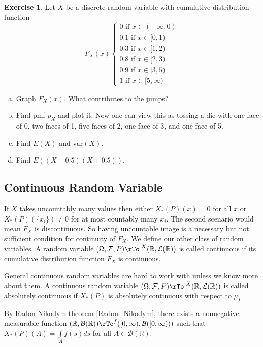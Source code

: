 \documentclass[12pt]{amsart}
\theoremstyle{definition}
\newtheorem{exercise}[theorem]{Exercise}
\begin{document}
\begin{exercise} Let $X$ be a discrete random variable with cumulative distribution function
$$F_X(x) \begin{cases} 0 \text{ if } x \in (-\infty, 0) \\ 0.1 \text{ if } x \in [0, 1) \\ 0.3 \text{ if } x \in [1, 2) \\ 0.8 \text{ if } x \in [2,3) \\ 0.9 \text{ if } x \in [3,5) \\ 1 \text{ if } x \in [5, \infty) \end{cases}$$
\begin{enumerate}[a.]
\item Graph $F_X(x)$. What contributes to the jumps?
\item Find pmf $p_X$ and plot it. Now one can view this as tossing a die with one face of 0, two faces of 1, five faces of 2, one face of 3, and one face of 5.
\item Find $E(X)$ and $\text{var}(X)$.
\item Find $E((X - 0.5)(X + 0.5))$.
\end{enumerate}
\end{exercise}

\subsection{Continuous Random Variable} \label{continuous_random_variable} If $X$ takes uncountably many values then either $X_*(P)(x) = 0$ for all $x$ or $X_*(P)(\{x_i\}) \neq 0$ for at most countably many $x_i$. The second scenario would mean $F_X$ is discontinuous. So having uncountable image is a necessary but not sufficient condition for continuity of $F_X$. We define our other class of random variables.
\dfn A random variable $(\Omega, \mathcal{F}, P) \rTo^{\,\, X} (\mathbb{R}, \mathcal{L}(\mathbb{R}))$ is called continuous if its cumulative distribution function $F_X$ is continuous.

General continuous random variables are hard to work with unless we know more about them.
\dfn  A continuous random variable $(\Omega, \mathcal{F}, P) \rTo^{\,\, X} (\mathbb{R}, \mathcal{L}(\mathbb{R}))$ is called absolutely continuous if $X_*(P)$ is absolutely continuous with respect to $\mu_L$.

By Radon-Nikodym theorem \ref{Radon_Nikodym}, there exists a nonnegative measurable function $(\mathbb{R}, \mathcal{B}(\mathbb{R})) \rTo^f ([0,\infty), \mathcal{B}([0,\infty)))$ such that $X_*(P)(A) = \int\limits_A f(s) ds$ for all $A \in \mathcal{B}(\mathbb{R})$.
\end{document}
